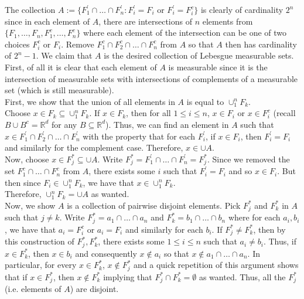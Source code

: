 \documentclass[12pt]{article}
\newcommand{\R}{\mathbb{R}}
\newenvironment{solution}[2][Solution]{\begin{trivlist}
\item[\hskip \labelsep {\bfseries #1}]}{\end{trivlist}}
\begin{document}
\begin{solution}{}

    The collection $A:= \{F_1^{'} \cap \hdots \cap F_n^{'}: F_i^{'} = F_i$ or $F_i^{'} = F_i^c\}$ is clearly of
    cardinality $2^n$ since in each element of $A$, there are intersections of $n$ elements from 
    $\{F_1,\hdots,F_n,F_1^c,\hdots,F_n^c\}$ where each element of the intersection
    can be one of two choices $F_i^c$ or $F_i$. Remove $F_1^c \cap F_2^c \cap \hdots \cap F_n^c$ from $A$ so 
    that $A$ then has cardinality of $2^n-1$. We claim that $A$ is the desired collection of Lebesgue measurable 
    sets. First, of all it is clear that each element of $A$ is measurable since it is the intersection of
    measurable sets with intersections of complements of a measurable set (which is still measurable).\\
    
    First, we show that the union of all elements in $A$ is equal to $\cup_1^n F_k$.\\
    Choose $x\in F_k\subseteq \cup_1^n F_k.$ If $x\in F_k$, then for all $1\leq i\leq n$, $x\in F_i$ or $x\in F_i^c$
    (recall $B \cup B^c = \R^d$ for any $B\subseteq\R^d$). Thus, we can find an element in $A$ such that
    $x\in F_1^{'} \cap F_2^{'} \cap \hdots \cap F_n^{'}$ with the property that for each $F_i^{'}$, if $x\in F_i$,
    then $F_i^{'}=F_i$ and similarly for the complement case. Therefore, $x\in\cup A$.\\
    Now, choose $x\in F_j^{*}\subseteq \cup A$. Write $F_j^{*} = F_1^{'}\cap\hdots\cap F_n^{'} = F_j^{*}$. 
    Since we removed the set $F_1^c \cap \hdots \cap F_n^c$ from $A$, there exists some $i$ such that
    $F_i^{'} = F_i$ and so $x\in F_i$. But then since $F_i\in\cup_1^n F_k$, we have that $x\in\cup_1^n F_k$.\\
    Therefore, $\cup_1^n F_k = \cup A$ as wanted.\\
    
    Now, we show $A$ is a collection of pairwise disjoint elements. Pick $F_j^{*}$ and $F_k^{*}$ in $A$ such that $j\neq k$.
    Write $F_j^{*} = a_1 \cap \hdots \cap a_n$ and $F_k^{*} = b_1 \cap \hdots \cap b_n$ where for each $a_i, b_i$, we have that
    $a_i = F_i^c$ or $a_i = F_i$ and similarly for each $b_i$. If $F_j^{*}\neq F_k^{*}$, then by this construction of $F_j^*,F_k^*$, there
    exists some $1\leq i\leq n$ such that $a_i\neq b_i$. Thus, if $x\in F_k^{*}$, then $x\in b_i$ and consequently $x\not\in a_i$
    so that $x\not\in a_1\cap \hdots\cap a_n$. In particular, for every $x\in F_k^{*}$, $x\not\in F_j^{*}$ and a quick repetition
    of this argument shows that if $x\in F_j^{*}$, then $x\not\in F_k^{*}$ implying that $F_j^{*}\cap F_k^{*}=\emptyset$ as wanted.
    Thus, all the $F_j^{*}$ (i.e. elements of $A$) are disjoint.\\
    

\end{solution}
\end{document}
